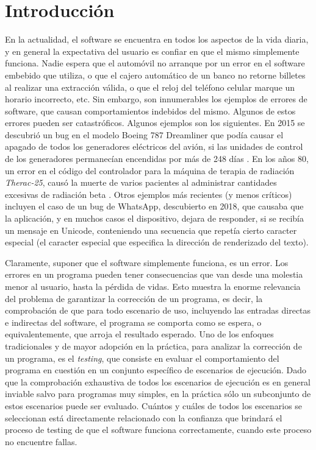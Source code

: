 \chapter{Introducci\'on}
\label{cap:introduccion}

En la actualidad, el software se encuentra en todos los aspectos de la vida diaria, y en general la expectativa del usuario es confiar en que el mismo simplemente funciona. Nadie espera que el autom\'ovil no arranque por un error en el software embebido que utiliza, o que el cajero autom\'atico de un banco no retorne billetes al realizar una extracci\'on v\'alida, o que el reloj del tel\'efono celular marque un horario incorrecto, etc. Sin embargo, son innumerables los ejemplos de errores de software, que causan comportamientos indebidos del mismo. Algunos de estos errores pueden ser catastr\'oficos. Algunos ejemplos son los siguientes. En 2015 se descubri\'o un bug en el modelo Boeing 787 Dreamliner que pod\'ia causar el apagado de todos los generadores el\'ectricos del avi\'on, si las unidades de control de los generadores permanec\'ian encendidas por m\'as de 248 d\'ias \cite{bibliography.bugs.boeing}. En los a\~nos 80, un error en el c\'odigo del controlador para la m\'aquina de terapia de radiaci\'on \emph{Therac-25}, caus\'o la muerte de varios pacientes al administrar cantidades excesivas de radiaci\'on beta \cite{bibliography.bugs.Therac25LevesonT93}. Otros ejemplos m\'as recientes (y menos cr\'iticos) incluyen el caso de un bug de WhatsApp, descubierto en 2018, que causaba que la aplicaci\'on, y en muchos casos el dispositivo, dejara de responder, si se recib\'ia un mensaje en Unicode, conteniendo una secuencia que repet\'ia cierto caracter especial (el caracter especial que especifica la direcci\'on de renderizado del texto).

Claramente, suponer que el software simplemente funciona, es un error. Los errores en un programa pueden tener consecuencias que van desde una molestia menor al usuario, hasta la p\'erdida de vidas. Esto muestra la enorme relevancia del problema de garantizar la correcci\'on de un programa, es decir, la comprobaci\'on de que para todo escenario de uso, incluyendo las entradas directas e indirectas del software, el programa se comporta como se espera, o equivalentemente, que arroja el resultado esperado. Uno de los enfoques tradicionales y de mayor adopci\'on en la pr\'actica, para analizar la correcci\'on de un programa, es el \emph{testing}, que consiste en evaluar el comportamiento del programa en cuesti\'on en un conjunto espec\'ifico de escenarios de ejecuci\'on. Dado que la comprobaci\'on exhaustiva de todos los escenarios de ejecuci\'on es en general inviable salvo para programas muy simples, en la pr\'actica s\'olo un subconjunto de estos escenarios puede ser evaluado. Cu\'antos y cu\'ales de todos los escenarios se seleccionan est\'a directamente relacionado con la confianza que brindar\'a el proceso de testing de que el software funciona correctamente, cuando este proceso no encuentre fallas.

